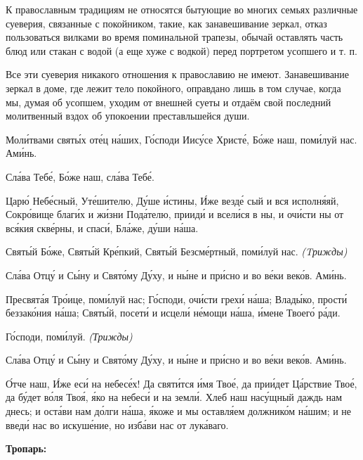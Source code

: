 К православным традициям не относятся бытующие во многих семьях различные суеверия, связанные с покойником, такие, как занавешивание зеркал, отказ пользоваться вилками во время поминальной трапезы, обычай оставлять часть блюд или стакан с водой (а еще хуже с водкой) перед портретом усопшего и т. п. 

Все эти суеверия никакого отношения к православию не имеют. Занавешивание зеркал в доме, где лежит тело покойного, оправдано лишь в том случае, когда мы, думая об усопшем, уходим от внешней суеты и отдаём свой последний молитвенный вздох об упокоении преставльшейся души.\bfseries \itshape  

\normalfont{}\normalfont{} 


\mychapterending


 


Моли́твами святы́х оте́ц на́ших, Го́споди Иису́се Христе́, Бо́же наш, поми́луй
нас. Ами́нь.


   Сла́ва Тебе́, Бо́же наш, сла́ва Тебе́.


   Царю́ Небе́сный, Уте́шителю, Ду́ше и́стины, И́же везде́ сый и вся
исполня́яй, Сокро́вище благи́х и жи́зни Пода́телю, прииди́ и всели́ся в ны, и
очи́сти ны от вся́кия скве́рны, и спаси́, Бла́же, ду́ши на́ша.


   Святы́й Бо́же, Святы́й Кре́пкий, Святы́й Безсме́ртный, поми́луй нас.
\itshape (Tрижды)\normalfont{}


   Сла́ва Отцу́ и Сы́ну и Свято́му Ду́ху, и ны́не и при́сно и во ве́ки веко́в.
Ами́нь.


   Пресвята́я Тро́ице, поми́луй нас; Го́споди, очи́сти грехи́ на́ша; Влады́ко,
прости́ беззако́ния на́ша; Святы́й, посети́ и исцели́ не́мощи на́ша, и́мене
Твоего́ ра́ди.


   Го́споди, поми́луй. \itshape (Трижды)\normalfont{}


   Сла́ва Отцу́ и Сы́ну и Свято́му Ду́ху, и ны́не и при́сно и во ве́ки веко́в.
Ами́нь.


   О́тче наш, И́же еси́ на небесе́х! Да святи́тся и́мя Твое́, да прии́дет
Ца́рствие Твое́, да бу́дет во́ля Твоя́, я́ко на небеси́ и на земли́. Хлеб наш
насу́щный даждь нам днесь; и оста́ви нам до́лги на́ша, я́коже и мы оставля́ем
должнико́м на́шим; и не введи́ нас во искуше́ние, но изба́ви нас от
лука́ваго.



 

\bfseries Тропарь:\normalfont{}


